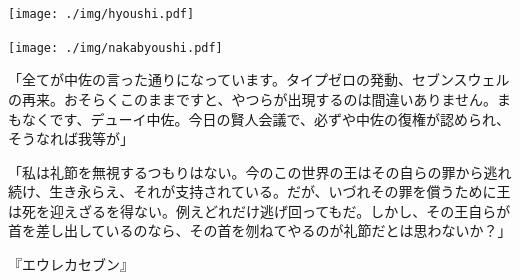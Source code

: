 ﻿\documentclass[9pt,b5paper,tombo,openany]{jsbook}
\begin{document}
\enlargethispage{\paperwidth}
\thispagestyle{empty}
\vspace*{-1truein}
\vspace*{-\topmargin}
\vspace*{-1.15\headheight}
\vspace*{-\headsep}
\vspace*{-\topskip}
\noindent\hspace*{-1.16in}\hspace*{-\oddsidemargin}
\texttt{[image: ./img/hyoushi.pdf]}

\mbox{}
\newpage
\thispagestyle{empty}

\mbox{}
\newpage
\thispagestyle{empty}

\newpage
\enlargethispage{\paperwidth}
\thispagestyle{empty}
\vspace*{-1truein}
\vspace*{-\topmargin}
\vspace*{-1.15\headheight}
\vspace*{-\headsep}
\vspace*{-\topskip}
\noindent\hspace*{-1.16in}\hspace*{-\oddsidemargin}
\texttt{[image: ./img/nakabyoushi.pdf]}

\tableofcontents
\thispagestyle{empty}

\newpage
\thispagestyle{empty}
\begin{center}
	\begin{minipage}{0.3\hsize}
		\begin{tiny}
			「全てが中佐の言った通りになっています。タイプゼロの発動、セブンスウェルの再来。おそらくこのままですと、やつらが出現するのは間違いありません。まもなくです、デューイ中佐。今日の賢人会議で、必ずや中佐の復権が認められ、そうなれば我等が」

			「私は礼節を無視するつもりはない。今のこの世界の王はその自らの罪から逃れ続け、生き永らえ、それが支持されている。だが、いづれその罪を償うために王は死を迎えざるを得ない。例えどれだけ逃げ回ってもだ。しかし、その王自らが首を差し出しているのなら、その首を刎ねてやるのが礼節だとは思わないか？」
			\begin{flushright}
				『エウレカセブン』
			\end{flushright}
		\end{tiny}
	\end{minipage}
\end{center}
\end{document}

